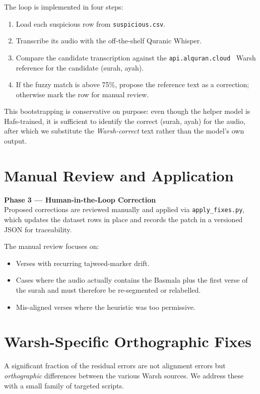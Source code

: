 \documentclass[12pt,a4paper]{report}
\newcommand{\phaseblock}[3]{%
  \begin{tcolorbox}[
    enhanced, colback=white, colframe=black,
    leftrule=5pt, sharp corners, before upper={\parindent0pt}
  ]
  {\bfseries\color{black}Phase #1 --- #2}\\[4pt]
  \small #3
  \end{tcolorbox}%
}
\begin{document}
The loop is implemented in four steps:
\begin{enumerate}
  \item Load each suspicious row from \texttt{suspicious.csv}.
  \item Transcribe its audio with the off-the-shelf Quranic Whisper.
  \item Compare the candidate transcription against the
        \texttt{api.alquran.cloud}~\cite{alqurancloud} Warsh reference
        for the candidate (surah, ayah).
  \item If the fuzzy match is above 75\%, propose the reference text as a
        correction; otherwise mark the row for manual review.
\end{enumerate}

This bootstrapping is conservative on purpose: even though the helper
model is Hafs-trained, it is sufficient to identify the correct
(surah, ayah) for the audio, after which we substitute the
\emph{Warsh-correct} text rather than the model's own output.

\section{Manual Review and Application}

\phaseblock{3}{Human-in-the-Loop Correction}{Proposed corrections are
reviewed manually and applied via \texttt{apply\_fixes.py}, which
updates the dataset rows in place and records the patch in a versioned
JSON for traceability.}

The manual review focuses on:
\begin{itemize}
  \item Verses with recurring tajweed-marker drift.
  \item Cases where the audio actually contains the Basmala plus the
        first verse of the surah and must therefore be re-segmented or
        relabelled.
  \item Mis-aligned verses where the heuristic was too permissive.
\end{itemize}

\section{Warsh-Specific Orthographic Fixes}

A significant fraction of the residual errors are not alignment errors
but \emph{orthographic} differences between the various Warsh sources.
We address these with a small family of targeted scripts.
\end{document}
